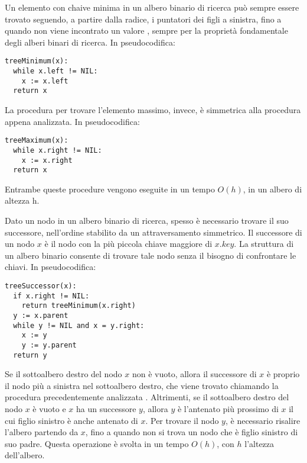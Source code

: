 \vspace{10pt}

Un elemento con chaive minima in un albero binario di ricerca può sempre essere trovato seguendo, a partire dalla radice, i puntatori  dei figli a sinistra, fino a quando non viene incontrato un valore , sempre per la proprietà fondamentale degli alberi binari di ricerca. In pseudocodifica:

\begin{lstlisting}
treeMinimum(x):
  while x.left != NIL:
    x := x.left
  return x
\end{lstlisting}

\vspace{10pt}

La procedura per trovare l'elemento massimo, invece, è simmetrica alla procedura appena analizzata. In pseudocodifica:

\begin{lstlisting}
treeMaximum(x):
  while x.right != NIL:
    x := x.right
  return x
\end{lstlisting}

Entrambe queste procedure vengono eseguite in un tempo \(O(h)\), in un albero di altezza h. 

\vspace{10pt}

Dato un nodo in un albero binario di ricerca, spesso è necessario trovare il suo successore, nell'ordine stabilito da un attraversamento simmetrico. Il successore di un nodo \(x\) è il nodo con la più piccola chiave maggiore di \(x.key\). La struttura di un albero binario consente di trovare tale nodo senza il bisogno di confrontare le chiavi. In pseudocodifica:

\begin{lstlisting}
treeSuccessor(x):
  if x.right != NIL:
    return treeMinimum(x.right)
  y := x.parent
  while y != NIL and x = y.right:
    x := y
    y := y.parent
  return y
\end{lstlisting}

Se il sottoalbero destro del nodo \(x\) non è vuoto, allora il successore di \(x\) è proprio il nodo più a sinistra nel sottoalbero destro, che viene trovato chiamando la procedura precedentemente analizzata . Altrimenti, se il sottoalbero destro del nodo \(x\) è vuoto e \(x\) ha un successore \(y\), allora \(y\) è l'antenato più prossimo di \(x\) il cui figlio sinistro è anche antenato di \(x\). Per trovare il nodo \(y\), è necessario risalire l'albero partendo da \(x\), fino a quando non si trova un nodo che è figlio sinistro di suo padre. Questa operazione è svolta in un tempo \(O(h)\), con \(h\) l'altezza dell'albero. 

